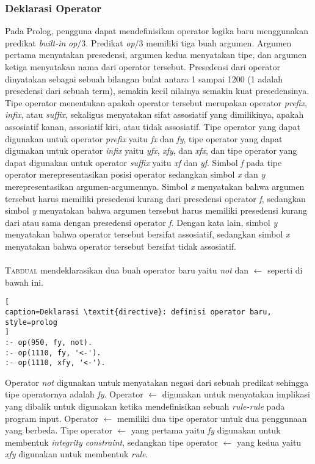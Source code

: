 \subsubsection{Deklarasi Operator}

Pada Prolog, pengguna dapat mendefinisikan operator logika baru menggunakan predikat \textit{built-in} \textit{op$/$}3. Predikat \textit{op$/$}3 memiliki tiga buah argumen. Argumen pertama menyatakan presedensi, argumen kedua menyatakan tipe, dan argumen ketiga menyatakan nama dari operator tersebut. Presedensi dari operator dinyatakan sebagai sebuah bilangan bulat antara 1 sampai 1200 (1 adalah presedensi dari sebuah term), semakin kecil nilainya semakin kuat presedensinya. Tipe operator menentukan apakah operator tersebut merupakan operator \textit{prefix}, \textit{infix}, atau \textit{suffix}, sekaligus menyatakan sifat assosiatif yang dimilikinya, apakah assosiatif kanan, assosiatif kiri, atau tidak assosiatif. Tipe operator yang dapat digunakan untuk operator \textit{prefix} yaitu \textit{fx} dan \textit{fy}, tipe operator yang dapat digunakan untuk operator \textit{infix} yaitu \textit{yfx}, \textit{xfy}, dan \textit{xfx}, dan tipe operator yang dapat digunakan untuk operator \textit{suffix} yaitu \textit{xf} dan \textit{yf}. Simbol \textit{f} pada tipe operator merepresentasikan posisi operator sedangkan simbol \textit{x} dan \textit{y} merepresentasikan argumen-argumennya. Simbol \textit{x} menyatakan bahwa argumen tersebut harus memiliki presedensi kurang dari presedensi operator \textit{f}, sedangkan simbol \textit{y} menyatakan bahwa argumen tersebut harus memiliki presedensi kurang dari atau sama dengan presedensi operator \textit{f}. Dengan kata lain, simbol \textit{y} menyatakan bahwa operator tersebut bersifat assosiatif, sedangkan simbol \textit{x} menyatakan bahwa operator tersebut bersifat tidak assosiatif. 
\\ \\
\textsc{Tabdual} mendeklarasikan dua buah operator baru yaitu \textit{not} dan $\leftarrow$ seperti di bawah ini.
\\

\begin{lstlisting}[
caption=Deklarasi \textit{directive}: definisi operator baru,
style=prolog
]
:- op(950, fy, not).
:- op(1110, fy, '<-').
:- op(1110, xfy, '<-').
\end{lstlisting}

Operator \textit{not} digunakan untuk menyatakan negasi dari sebuah predikat sehingga tipe operatornya adalah \textit{fy}. Operator $\leftarrow$ digunakan untuk menyatakan implikasi yang dibalik untuk digunakan ketika mendefinisikan sebuah \textit{rule-rule} pada program input. Operator $\leftarrow$ memiliki dua tipe operator untuk dua penggunaan yang berbeda. Tipe operator $\leftarrow$ yang pertama yaitu \textit{fy} digunakan untuk membentuk \textit{integrity constraint}, sedangkan tipe operator $\leftarrow$ yang kedua yaitu \textit{xfy} digunakan untuk membentuk \textit{rule}.

